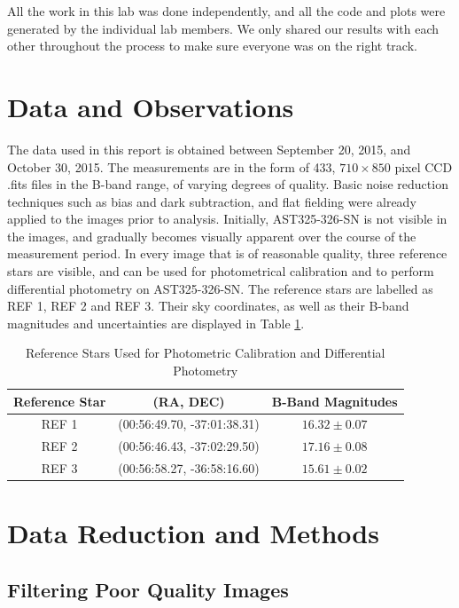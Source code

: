 \documentclass{article}
\begin{document}
All the work in this lab was done independently, and all the code and plots were generated by the individual lab members. We only shared our results with each other throughout the process to make sure everyone 
was on the right track.
\newpage

\section{Data and Observations}

The data used in this report is obtained between September 20, 2015, and October 30, 2015. The measurements are in the form of 433, $710\times850$ pixel CCD .fits files in the B-band
range, of varying degrees of quality. Basic noise reduction techniques such as bias and dark subtraction, and flat fielding were already applied to the images prior to analysis. 
Initially, AST325-326-SN is not visible in the images, and gradually becomes visually apparent over the course of the measurement period. In every image that is of reasonable quality, 
three reference stars are visible, and can be used for photometrical calibration and to perform differential photometry on AST325-326-SN. The reference stars are labelled as REF 1, 
REF 2 and REF 3. Their sky coordinates, as well as their B-band magnitudes and uncertainties are displayed in Table \ref{tab:ref_stars}.

\begin{table}[htbp]
    \centering
    \begin{tabular}{c|c|c}
        \hline
        \textbf{Reference Star} & \textbf{(RA, DEC)} & \textbf{B-Band Magnitudes} \\
        \hline
        REF 1 & (00:56:49.70, -37:01:38.31) & $16.32 \pm 0.07$ \\
        REF 2 & (00:56:46.43, -37:02:29.50) & $17.16 \pm 0.08$  \\
        REF 3 & (00:56:58.27, -36:58:16.60) & $15.61 \pm 0.02$ \\
        \hline
    \end{tabular}
    \caption{Reference Stars Used for Photometric Calibration and Differential Photometry}
    \label{tab:ref_stars}
\end{table}

\section{Data Reduction and Methods}
\subsection{Filtering Poor Quality Images}
\end{document}
